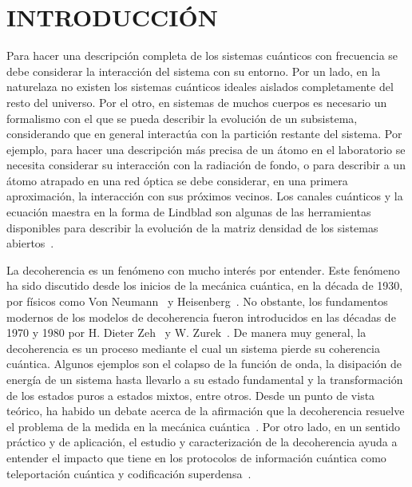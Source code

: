 \chapter{INTRODUCCIÓN}
Para hacer una descripción completa de los sistemas cuánticos 
con frecuencia se debe considerar la interacción del sistema con su entorno. Por un lado, 
en la naturelaza no existen los sistemas cuánticos ideales 
aislados completamente del resto del universo. 
Por el otro, en sistemas de muchos cuerpos es necesario un formalismo
con el que se pueda describir la evolución de un subsistema, considerando
que en general interactúa con la partición restante del sistema.
Por ejemplo, para hacer una descripción más precisa de un átomo en el laboratorio se
necesita considerar su interacción con la radiación de fondo, 
o para describir a un átomo atrapado en una red óptica se debe considerar, 
en una primera aproximación, la interacción con sus próximos vecinos.
Los canales cuánticos y la ecuación maestra en la forma de Lindblad son algunas
de las herramientas disponibles para describir la evolución de la 
matriz densidad de los sistemas abiertos~\cite{nielsen_chuang_2011}. 

La decoherencia es un fenómeno con mucho interés por entender. 
Este fenómeno ha sido discutido desde los inicios de la mecánica cuántica,
en la década de 1930, por físicos como
Von Neumann~\cite{von2018mathematical} y Heisenberg~\cite{bacciagaluppi2003role}.
No obstante, los fundamentos modernos de los modelos
de decoherencia fueron introducidos en las décadas de 1970 y 1980 
por H. Dieter Zeh~\cite{zeh1970interpretation}  y W. Zurek~\cite{zurek1981pointer}. 
De manera muy general, la decoherencia es un proceso mediante el cual 
un sistema pierde su coherencia cuántica. 
Algunos ejemplos son el colapso de 
la función de onda, la disipación de energía 
de un sistema hasta llevarlo a su estado fundamental y la transformación de los 
estados puros a estados mixtos, entre otros.
Desde un punto de vista teórico, ha habido un debate acerca de la afirmación
que la decoherencia resuelve el problema de la medida en 
la mecánica cuántica~\cite{bacciagaluppi2003role}.
Por otro lado, en un sentido práctico y de aplicación, 
el estudio y caracterización de la decoherencia 
ayuda a entender el impacto que tiene en los protocolos de información 
cuántica como teleportación cuántica y codificación 
superdensa~\cite{pepino2011open}. 


